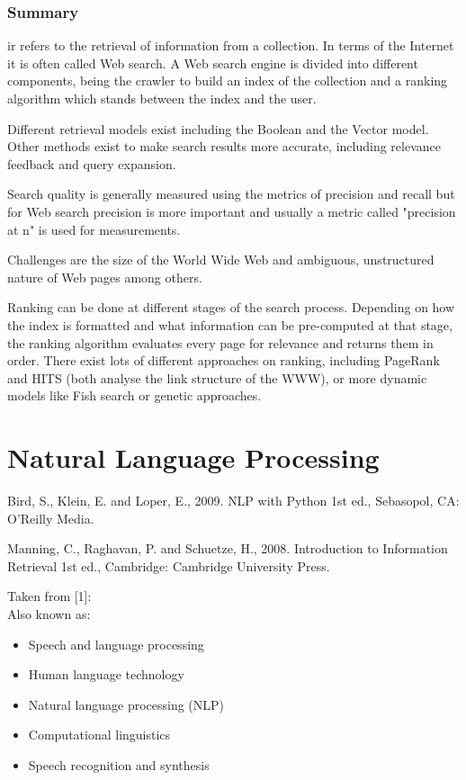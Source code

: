 \subsubsection*{Summary}

\gls{ir} refers to the retrieval of information from a collection. In terms of the Internet it is often called Web search. A Web search engine is divided into different components, being the crawler to build an index of the collection and a ranking algorithm which stands between the index and the user.

Different retrieval models exist including the Boolean and the Vector model. Other methods exist to make search results more accurate, including relevance feedback and query expansion.

Search quality is generally measured using the metrics of precision and recall but for Web search precision is more important and usually a metric called "precision at n" is used for measurements.

Challenges are the size of the World Wide Web and ambiguous, unstructured nature of Web pages among others.

Ranking can be done at different stages of the search process. Depending on how the index is formatted and what information can be pre-computed at that stage, the ranking algorithm evaluates every page for relevance and returns them in order. There exist lots of different approaches on ranking, including PageRank and HITS (both analyse the link structure of the WWW), or more dynamic models like Fish search or genetic approaches.


\section{Natural Language Processing}

\begin{comment}
  Damerau-Levensthein for clinamen!
\end{comment}

Bird, S., Klein, E. and Loper, E., 2009. NLP with Python 1st ed., Sebasopol, CA: O'Reilly Media.\citep{Bird2009}

Manning, C., Raghavan, P. and Schuetze, H., 2008. Introduction to Information Retrieval 1st ed., Cambridge: Cambridge University Press.\citep{Manning2009}

Taken from [1]:\citep{Jurafsky2009}\\
Also known as:\\
\begin{itemize}
  \item Speech and language processing
  \item Human language technology
  \item Natural language processing (NLP)
  \item Computational linguistics
  \item Speech recognition and synthesis
\end{itemize}

